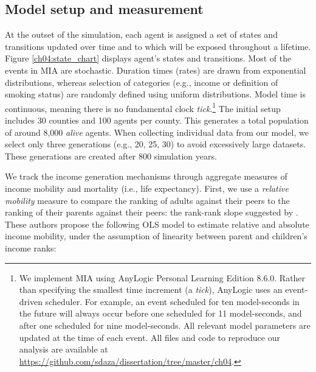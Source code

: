 \documentclass[class=article, crop=false, 12pt]{standalone}
\begin{document}


\subsection{Model setup and measurement}

At the outset of the simulation, each agent is assigned a set of states and transitions updated over time and to which will be exposed throughout a lifetime. Figure \ref{ch04:state_chart} displays agent's states and transitions. Most of the events in MIA are stochastic. Duration times (rates) are drawn from exponential distributions, whereas selection of categories (e.g., income or definition of smoking status) are randomly defined using uniform distributions. Model time is continuous, meaning there is no fundamental clock \emph{tick}.\footnote{We implement MIA using AnyLogic Personal Learning Edition 8.6.0. Rather than specifying the smallest time increment (a \emph{tick}), AnyLogic uses an event-driven scheduler. For example, an event scheduled for ten model-seconds in the future will always occur before one scheduled for 11 model-seconds, and after one scheduled for nine model-seconds. All relevant model parameters are updated at the time of each event. All files and code to reproduce our analysis are available at \url{https://github.com/sdaza/dissertation/tree/master/ch04}.} The initial setup includes 30 counties and 100 agents per county. This generates a total population of around 8,000 \textit{alive} agents. When collecting individual data from our model, we select only three generations (e.g., 20, 25, 30) to avoid excessively large datasets. These generations are created after 800 simulation years.

We track the income generation mechanisms through aggregate measures of income mobility and mortality (i.e., life expectancy). First, we use a \emph{relative mobility} measure to compare the ranking of adults against their peers to the ranking of their parents against their peers: the rank-rank slope suggested by \citet{chetty2014}. These authors propose the following OLS model to estimate relative and absolute income mobility, under the assumption of linearity between parent and children's income ranks:
\end{document}
